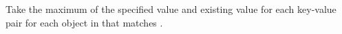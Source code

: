 Take the maximum of the specified value and existing value for each key-value
pair for each object in  that matches .


